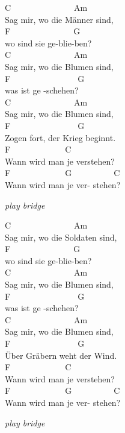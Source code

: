 \documentclass[
  letterpaper,
  a5paper]{memoir}
\begin{document}
C~~~~~~~~~~~~~~~Am~~~~~~~~~~~\\
Sag mir, wo die Männer sind,\\
F~~~~~~~~~~~~~~~G\\
wo sind sie ge-blie-ben?\\
C~~~~~~~~~~~~~~~Am~~~~~~~~~~~\\
Sag mir, wo die Blumen sind,\\
F~~~~~~~~~~~~~~~~G\\
was ist ge -schehen?\\
C~~~~~~~~~~~~~~~Am~~~~~~~~~~~\\
Sag mir, wo die Blumen sind,\\
F~~~~~~~~~~~~~~~~G\\
Zogen fort, der Krieg beginnt.\\
F~~~~~~~~~~~~~C~~~~~~~~~~~~~~~~~\\
Wann wird man je verstehen?~~~~~\\
F~~~~~~~~~~~~~G~~~~~~~~~~C\\
Wann wird man je ver- stehen?

\emph{play bridge}

C~~~~~~~~~~~~~~~Am~~~~~~~~~~~\\
Sag mir, wo die Soldaten sind,\\
F~~~~~~~~~~~~~~~G\\
wo sind sie ge-blie-ben?\\
C~~~~~~~~~~~~~~~Am~~~~~~~~~~~\\
Sag mir, wo die Blumen sind,\\
F~~~~~~~~~~~~~~~~G\\
was ist ge -schehen?\\
C~~~~~~~~~~~~~~~Am~~~~~~~~~~~\\
Sag mir, wo die Blumen sind,\\
F~~~~~~~~~~~~~~~~G\\
Über Gräbern weht der Wind.\\
F~~~~~~~~~~~~~C~~~~~~~~~~~~~~~~~\\
Wann wird man je verstehen?~~~~~\\
F~~~~~~~~~~~~~G~~~~~~~~~~C\\
Wann wird man je ver- stehen?

\emph{play bridge}
\end{document}

